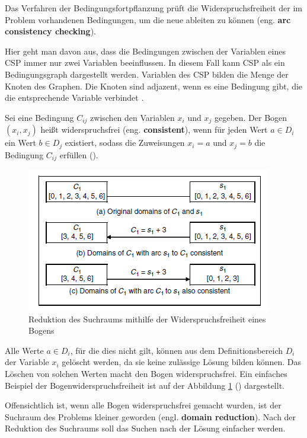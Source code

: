 Das Verfahren der Bedingungsfortpflanzung prüft die Widerspruchsfreiheit der im Problem vorhandenen Bedingungen, um die neue ableiten zu können (eng. {\bf arc consistency checking}).

Hier geht man davon aus, dass die Bedingungen zwischen der Variablen eines CSP immer nur zwei Variablen beeinflussen. In diesem Fall kann CSP als ein Bedingungsgraph dargestellt werden. Variablen des CSP bilden die Menge der Knoten des Graphen. Die Knoten sind adjazent, wenn es eine Bedingung gibt, die die entsprechende Variable verbindet \citep[vgl.][]{CSP}.

Sei eine Bedingung $C_{ij}$ zwischen den Variablen $x_i$ und $x_j$ gegeben. Der Bogen $(x_i,x_j)$ heißt widerspruchsfrei (eng. {\bf consistent}), wenn für jeden Wert $a\in D_i$ ein Wert $b\in D_j$ existiert, sodass die Zuweisungen $x_i=a$ und $x_j=b$ die Bedingung $C_{ij}$ erfüllen (\cite{CSP}).

\newpage

\begin{figure}
	\vspace{-10pt}
	\vbox{
		\centering
		\includegraphics[scale=0.7]{fig/ConstraintPropagation1.png}
	}
	\caption{Reduktion des Suchraums mithilfe der Widerspruchsfreiheit eines Bogens}
	\label{fig:ConstraintPropagation1}
\end{figure}

Alle Werte $a\in D_i$, für die dies nicht gilt, können aus dem Definitionsbereich $D_i$ der Variable $x_i$ gelöscht werden, da sie keine zulässige Lösung bilden können. Das Löschen von solchen Werten macht den Bogen widerspruchsfrei. Ein einfaches Beispiel der Bogenwiderspruchsfreiheit ist auf der Abbildung \ref{fig:ConstraintPropagation1} (\cite{CPforScheduling}) dargestellt.

\FloatBarrier

Offensichtlich ist, wenn alle Bogen widerspruchsfrei gemacht wurden, ist der Suchraum des Problems kleiner geworden (engl. {\bf domain reduction}). Nach der Reduktion des Suchraums soll das Suchen nach der Lösung einfacher werden.

